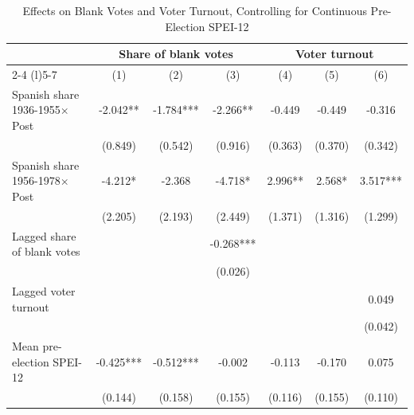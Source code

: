 \begin{table}[!h]
\caption{Effects on Blank Votes and Voter Turnout, Controlling for Continuous Pre-Election SPEI-12}
\renewcommand{\arraystretch}{1.25}
\setlength{\tabcolsep}{6pt}
\centering
\begin{tabular}[t]{lcccccc}
\hline
 & \multicolumn{3}{c}{Share of blank votes} & \multicolumn{3}{c}{Voter turnout} \\
\cmidrule(l){2-4} \cmidrule(l){5-7}
  & (1) & (2) & (3) & (4) & (5) & (6)\\
\hline
Spanish share 1936-1955$\times$Post & -2.042** & -1.784*** & -2.266** & -0.449 & -0.449 & -0.316\\
 & (0.849) & (0.542) & (0.916) & (0.363) & (0.370) & (0.342)\\
Spanish share 1956-1978$\times$Post & -4.212* & -2.368 & -4.718* & 2.996** & 2.568* & 3.517***\\
 & (2.205) & (2.193) & (2.449) & (1.371) & (1.316) & (1.299)\\
Lagged share of blank votes &  &  & -0.268*** &  &  & \\
 &  &  & (0.026) &  &  & \\
Lagged voter turnout &  &  &  &  &  & 0.049\\
 &  &  &  &  &  & (0.042)\\
Mean pre-election SPEI-12 & -0.425*** & -0.512*** & -0.002 & -0.113 & -0.170 & 0.075\\
 & (0.144) & (0.158) & (0.155) & (0.116) & (0.155) & (0.110)\\


\end{tabular}
\end{table}
